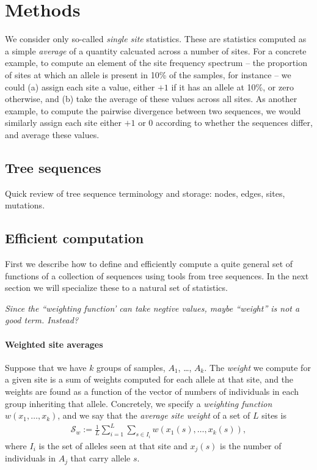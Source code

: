 \documentclass{article}
\newcommand{\site}{\mathcal{S}} %
\newcommand{\plr}[1]{{\color{blue} \it #1}}
\begin{document}
\section*{Methods}

We consider only so-called \emph{single site} statistics.
These are statistics computed as a simple \emph{average} 
of a quantity calcuated across a number of sites.
For a concrete example, to compute an element of the site frequency spectrum --
the proportion of sites at which an allele is present in 10\% of the samples, for instance --
we could 
(a) assign each site a value, either $+1$ if it has an allele at 10\%, or zero otherwise,
and
(b) take the average of these values across all sites.
As another example,
to compute the pairwise divergence between two sequences,
we would similarly assign each site either $+1$ or 0 according to whether the sequences differ,
and average these values.


\subsection*{Tree sequences}

Quick review of tree sequence terminology
and storage:
nodes,
edges,
sites,
mutations.


\subsection*{Efficient computation}

First we describe how to define
and efficiently compute a quite general set of functions of a collection of sequences
using tools from tree sequences.
In the next section we will specialize these to a natural set of statistics.

\plr{Since the ``weighting function' can take negtive values, maybe ``weight'' is not a good term.  Instead?}

\paragraph{Weighted site averages}
Suppose that we have $k$ groups of samples, $A_1$, \ldots, $A_k$.
The \emph{weight} we compute for a given site is a sum of weights computed for each allele at that site,
and the weights are found as a function of the vector of numbers of individuals in each group inheriting that allele.
Concretely, we specify a \emph{weighting function} $w(x_1, \ldots, x_k)$,
and we say that the \emph{average site weight} of a set of $L$ sites is
\begin{align} \label{eqn:average_site_weight}
    \site_w := \frac{1}{L} \sum_{i=1}^L \sum_{s \in I_i} w(x_1(s), \ldots, x_k(s)) ,
\end{align}
where $I_i$ is the set of alleles seen at that site and
$x_j(s)$ is the number of individuals in $A_j$ that carry allele $s$.
\end{document}
